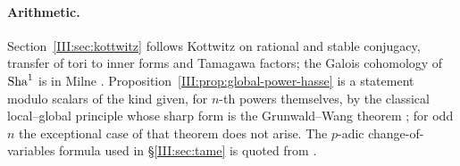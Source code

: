 \paragraph{Arithmetic.} Section~\ref{III:sec:kottwitz} follows Kottwitz \cite{Kot84} on rational and stable conjugacy, transfer of tori to inner forms and Tamagawa factors; the Galois cohomology of $\operatorname{Sha}^1$ is in Milne \cite{Mil06}. Proposition~\ref{III:prop:global-power-hasse} is a statement modulo scalars of the kind given, for $n$-th powers themselves, by the classical local--global principle whose sharp form is the Grunwald--Wang theorem \cite[Ch.~X]{AT68}; for odd $n$ the exceptional case of that theorem does not arise. The $p$-adic change-of-variables formula used in \S\ref{III:sec:tame} is quoted from \cite{Loe08}.
\endgroup
\begingroup
\providecommand{\F}{}\renewcommand{\F}{F}
\providecommand{\Z}{}\renewcommand{\Z}{\mathbb Z}
\providecommand{\C}{}\renewcommand{\C}{\mathbb C}
\providecommand{\Q}{}\renewcommand{\Q}{\mathbb Q}
\providecommand{\Fq}{}\renewcommand{\Fq}{\mathbb F}
\providecommand{\Nm}{}\renewcommand{\Nm}{\operatorname N}
\providecommand{\Nrd}{}\renewcommand{\Nrd}{\operatorname{Nrd}}
\providecommand{\Trd}{}\renewcommand{\Trd}{\operatorname{Trd}}
\providecommand{\Tr}{}\renewcommand{\Tr}{\operatorname{Tr}}
\providecommand{\Irr}{}\renewcommand{\Irr}{\operatorname{Irr}}
\providecommand{\Ind}{}\renewcommand{\Ind}{\operatorname{Ind}}
\providecommand{\Ad}{}\renewcommand{\Ad}{\operatorname{Ad}}
\providecommand{\tH}{}\renewcommand{\tH}{\widetilde H}
\providecommand{\tZ}{}\renewcommand{\tZ}{\widetilde Z}
\providecommand{\tU}{}\renewcommand{\tU}{\widetilde U}
\providecommand{\tV}{}\renewcommand{\tV}{\widetilde V}
\providecommand{\tth}{}\renewcommand{\tth}{\widetilde\theta}
\providecommand{\Ocal}{}\renewcommand{\Ocal}{\mathcal O}
\providecommand{\Pfr}{}\renewcommand{\Pfr}{\mathfrak P}
\providecommand{\pfr}{}\renewcommand{\pfr}{\mathfrak p}
\providecommand{\Reg}{}\renewcommand{\Reg}{\operatorname{Reg}}
\providecommand{\Heis}{}\renewcommand{\Heis}{\mathrm{Heis}}
\providecommand{\Cubes}{}\renewcommand{\Cubes}{\mathrm{Cubes}}
\providecommand{\Good}{}\renewcommand{\Good}{\mathrm{Good}}
\providecommand{\Ptag}{}\renewcommand{\Ptag}{\textnormal{\textbf{(P)}}}
\providecommand{\Pctag}{}\renewcommand{\Pctag}{\textnormal{\textbf{(P$^{\mathrm c}$)}}}
\providecommand{\Etag}{}\renewcommand{\Etag}{\textnormal{\textbf{(E)}}}
\providecommand{\Otag}{}\renewcommand{\Otag}{\textnormal{\textbf{(O)}}}
\providecommand{\Ctag}{}\renewcommand{\Ctag}{\textnormal{\textbf{(C)}}}
